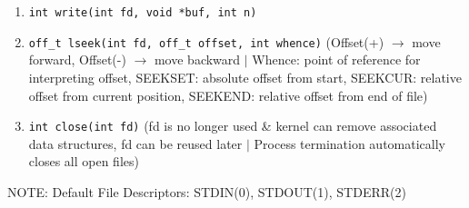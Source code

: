 \documentclass[landscape]{article}
\begin{document}
\begin{multicols*}{6}
\begin{itemize}
\begin{enumerate}
        \item \verb|int write(int fd, void *buf, int n)|
        \item \verb|off_t lseek(int fd, off_t offset, int whence)| (Offset(+) $\rightarrow$ move forward, Offset(-) $\rightarrow$ move backward $\vert$ Whence: point of reference for interpreting offset, SEEKSET: absolute offset from start, SEEKCUR: relative offset from current position, SEEKEND: relative offset from end of file)
        \item \verb|int close(int fd)| (fd is no longer used \& kernel can remove associated data structures, fd can be reused later $\vert$ Process termination automatically closes all open files)
      \end{enumerate}
      NOTE: Default File Descriptors: STDIN(0), STDOUT(1), STDERR(2)
    \end{itemize}


\end{multicols*}
\end{document}
